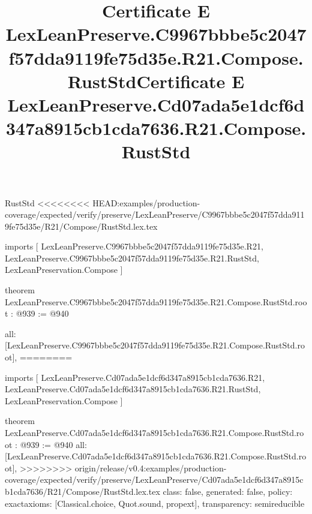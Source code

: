 \begin{lexlean}{RustStd}
<<<<<<<< HEAD:examples/production-coverage/expected/verify/preserve/LexLeanPreserve/C9967bbbe5c2047f57dda9119fe75d35e/R21/Compose/RustStd.lex.tex
\title{Certificate E LexLeanPreserve.C9967bbbe5c2047f57dda9119fe75d35e.R21.Compose.RustStd}
\begin{coremodule}
imports [
  LexLeanPreserve.C9967bbbe5c2047f57dda9119fe75d35e.R21,
  LexLeanPreserve.C9967bbbe5c2047f57dda9119fe75d35e.R21.RustStd,
  LexLeanPreservation.Compose
]

theorem LexLeanPreserve.C9967bbbe5c2047f57dda9119fe75d35e.R21.Compose.RustStd.root : @939 := @940 {
  all: [LexLeanPreserve.C9967bbbe5c2047f57dda9119fe75d35e.R21.Compose.RustStd.root],
========
\title{Certificate E LexLeanPreserve.Cd07ada5e1dcf6d347a8915cb1cda7636.R21.Compose.RustStd}
\begin{coremodule}
imports [
  LexLeanPreserve.Cd07ada5e1dcf6d347a8915cb1cda7636.R21,
  LexLeanPreserve.Cd07ada5e1dcf6d347a8915cb1cda7636.R21.RustStd,
  LexLeanPreservation.Compose
]

theorem LexLeanPreserve.Cd07ada5e1dcf6d347a8915cb1cda7636.R21.Compose.RustStd.root : @939 := @940 {
  all: [LexLeanPreserve.Cd07ada5e1dcf6d347a8915cb1cda7636.R21.Compose.RustStd.root],
>>>>>>>> origin/release/v0.4:examples/production-coverage/expected/verify/preserve/LexLeanPreserve/Cd07ada5e1dcf6d347a8915cb1cda7636/R21/Compose/RustStd.lex.tex
  class: false,
  generated: false,
  policy: exact{axioms: [Classical.choice, Quot.sound, propext]},
  transparency: semireducible
}


\end{coremodule}}
\end{coremodule}
\end{lexlean}
